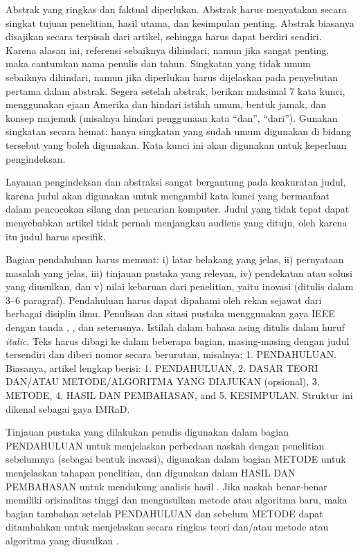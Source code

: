 \documentclass[10pt,a4paper]{article}
\begin{document}
Abstrak yang ringkas dan faktual diperlukan. Abstrak harus menyatakan secara singkat tujuan penelitian, hasil utama, dan kesimpulan penting. Abstrak biasanya disajikan secara terpisah dari artikel, sehingga harus dapat berdiri sendiri. Karena alasan ini, referensi sebaiknya dihindari, namun jika sangat penting, maka cantumkan nama penulis dan tahun. Singkatan yang tidak umum sebaiknya dihindari, namun jika diperlukan harus dijelaskan pada penyebutan pertama dalam abstrak. Segera setelah abstrak, berikan maksimal 7 kata kunci, menggunakan ejaan Amerika dan hindari istilah umum, bentuk jamak, dan konsep majemuk (misalnya hindari penggunaan kata ``dan'', ``dari''). Gunakan singkatan secara hemat: hanya singkatan yang sudah umum digunakan di bidang tersebut yang boleh digunakan. Kata kunci ini akan digunakan untuk keperluan pengindeksan.

Layanan pengindeksan dan abstraksi sangat bergantung pada keakuratan judul, karena judul akan digunakan untuk mengambil kata kunci yang bermanfaat dalam pencocokan silang dan pencarian komputer. Judul yang tidak tepat dapat menyebabkan artikel tidak pernah menjangkau audiens yang dituju, oleh karena itu judul harus spesifik.

Bagian pendahuluan harus memuat: i) latar belakang yang jelas, ii) pernyataan masalah yang jelas, iii) tinjauan pustaka yang relevan, iv) pendekatan atau solusi yang diusulkan, dan v) nilai kebaruan dari penelitian, yaitu inovasi (ditulis dalam 3--6 paragraf). Pendahuluan harus dapat dipahami oleh rekan sejawat dari berbagai disiplin ilmu. Penulisan dan sitasi pustaka menggunakan gaya IEEE dengan tanda \cite{sigala2019big}, \cite{nguyen2019machine}, dan seterusnya. Istilah dalam bahasa asing ditulis dalam huruf \textit{italic}. Teks harus dibagi ke dalam beberapa bagian, masing-masing dengan judul tersendiri dan diberi nomor secara berurutan, misalnya: 1. PENDAHULUAN. Biasanya, artikel lengkap berisi: 1. PENDAHULUAN, 2. DASAR TEORI DAN/ATAU METODE/ALGORITMA YANG DIAJUKAN (opsional), 3. METODE, 4. HASIL DAN PEMBAHASAN, and 5. KESIMPULAN. Struktur ini dikenal sebagai gaya IMRaD.

Tinjauan pustaka yang dilakukan penulis digunakan dalam bagian PENDAHULUAN untuk menjelaskan perbedaan naskah dengan penelitian sebelumnya (sebagai bentuk inovasi), digunakan dalam bagian METODE untuk menjelaskan tahapan penelitian, dan digunakan dalam HASIL DAN PEMBAHASAN untuk mendukung analisis hasil \cite{nguyen2019machine}. Jika naskah benar-benar memiliki orisinalitas tinggi dan mengusulkan metode atau algoritma baru, maka bagian tambahan setelah PENDAHULUAN dan sebelum METODE dapat ditambahkan untuk menjelaskan secara ringkas teori dan/atau metode atau algoritma yang diusulkan \cite{vinayakumar2019deep}.
\end{document}
